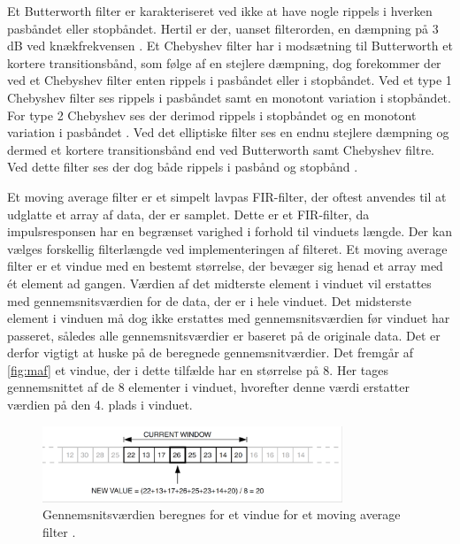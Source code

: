 \noindent
Et Butterworth filter er karakteriseret ved ikke at have nogle rippels i hverken pasbåndet eller stopbåndet. Hertil er der, uanset filterorden, en dæmpning på 3 dB ved knækfrekvensen \citep{nilsson2015}.
Et Chebyshev filter har i modsætning til Butterworth et kortere transitionsbånd, som følge af en stejlere dæmpning, dog forekommer der ved et Chebyshev filter enten rippels i pasbåndet eller i stopbåndet. Ved et type 1 Chebyshev filter ses rippels i pasbåndet samt en monotont variation i stopbåndet. For type 2 Chebyshev ses der derimod rippels i stopbåndet og en monotont variation i pasbåndet \citep{nilsson2015}. 
Ved det elliptiske filter ses en endnu stejlere dæmpning og dermed et kortere transitionsbånd end ved Butterworth samt Chebyshev filtre. Ved dette filter ses der dog både rippels i pasbånd og stopbånd \citep{nilsson2015}. 

\vspace{3mm}
\noindent
Et moving average filter er et simpelt lavpas FIR-filter, der oftest anvendes til at udglatte et array af data, der er samplet. Dette er et FIR-filter, da impulsresponsen har en begrænset varighed i forhold til vinduets længde. Der kan vælges forskellig filterlængde ved implementeringen af filteret. Et moving average filter er et vindue med en bestemt størrelse, der bevæger sig henad et array med ét element ad gangen. Værdien af det midterste element i vinduet vil erstattes med gennemsnitsværdien for de data, der er i hele vinduet. Det midsterste element i vinduen må dog ikke erstattes med gennemsnitsværdien før vinduet har passeret, således alle gennemsnitsværdier er baseret på de originale data. Det er derfor vigtigt at huske på de beregnede gennemsnitværdier. Det fremgår af \autoref{fig:maf} et vindue, der i dette tilfælde har en størrelse på 8. Her tages gennemsnittet af de 8 elementer i vinduet, hvorefter denne værdi erstatter værdien på den 4. plads i vinduet.\citep{atmel2002}

\begin{figure} [H]
\centering
\includegraphics[width=0.8\textwidth]{figures/maf}
\caption{Gennemsnitsværdien beregnes for et vindue for et moving average filter \citep{atmel2002}.}
\label{fig:maf}
\end{figure} 

